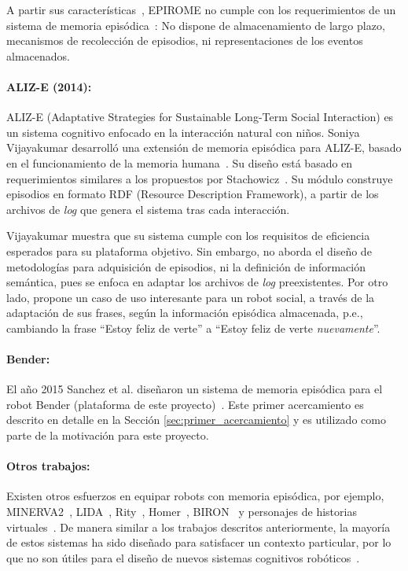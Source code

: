 A partir sus características~\cite{Jockel2007,Jockel2008}, EPIROME no cumple con los requerimientos de un sistema de memoria episódica~\cite{Stachowicz2012}: No dispone de almacenamiento de largo plazo, mecanismos de recolección de episodios, ni representaciones de los eventos almacenados.

\paragraph{ALIZ-E (2014):}
ALIZ-E (Adaptative Strategies for Sustainable Long-Term Social Interaction) es un sistema cognitivo enfocado en la interacción natural con niños. Soniya Vijayakumar desarrolló una extensión de memoria episódica para ALIZ-E, basado en el funcionamiento de la memoria humana~\cite{Vijayakumar2014}.  Su diseño está basado en requerimientos similares a los propuestos por Stachowicz~\cite{Stachowicz2012}. Su módulo construye episodios en formato RDF (Resource Description Framework), a partir de los archivos de \textit{log} que genera el sistema tras cada interacción.

Vijayakumar muestra que su sistema cumple con los requisitos de eficiencia esperados para su plataforma objetivo. Sin embargo, no aborda el diseño de metodologías para adquisición de episodios, ni la definición de información semántica, pues se enfoca en adaptar los archivos de \textit{log} preexistentes. Por otro lado, propone un caso de uso interesante para un robot social, a través de la adaptación de sus frases, según la información episódica almacenada, p.e., cambiando la frase ``Estoy feliz de verte'' a ``Estoy feliz de verte \textit{nuevamente}''. 


\paragraph{Bender:}
El año 2015 Sanchez et al. diseñaron un sistema de memoria episódica para el robot Bender (plataforma de este proyecto)~\cite{Sanchez:2015}. Este primer acercamiento es descrito en detalle en la Sección \ref{sec:primer_acercamiento} y es utilizado como parte de la motivación para este proyecto.



\paragraph{Otros trabajos:}
Existen otros esfuerzos en equipar robots con memoria episódica, por ejemplo, MINERVA2~\cite{Douglas1988}, LIDA~\cite{Feinstone2006}, Rity~\cite{Kuppuswamy2006}, Homer~\cite{Vere1990}, BIRON~\cite{Spexard2008} y personajes de historias virtuales~\cite{Brom2007}. De manera similar a los trabajos descritos anteriormente, la mayoría de estos sistemas ha sido diseñado para satisfacer un contexto particular, por lo que no son útiles para el diseño de nuevos sistemas cognitivos robóticos~\cite{Stachowicz2012}.

